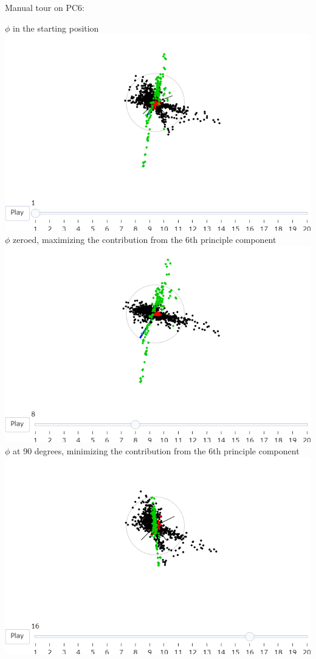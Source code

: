 \documentclass{monashthesis}
\begin{document}
Manual tour on PC6:

\(\phi\) in the starting position
\includegraphics{./output/fig8_phi_start.png} \(\phi\) zeroed,
maximizing the contribution from the 6th principle component
\includegraphics{./output/fig8_phi0.png} \(\phi\) at 90 degrees,
minimizing the contribution from the 6th principle component
\includegraphics{./output/fig8_phi90.png}
\end{document}
